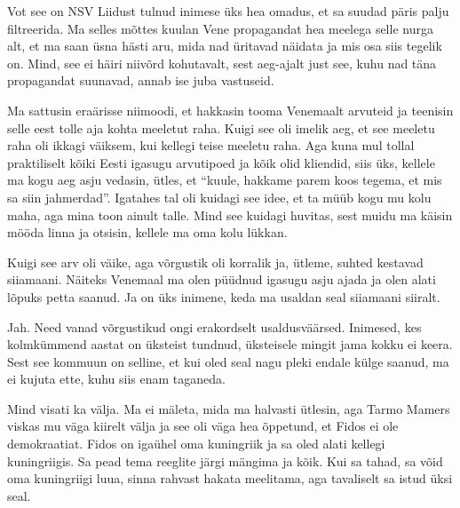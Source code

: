 
Vot see on NSV Liidust tulnud inimese üks hea omadus, et sa suudad päris palju 
filtreerida. Ma selles mõttes kuulan Vene propagandat hea meelega selle nurga 
alt, et ma saan üsna hästi aru, mida nad üritavad näidata ja mis osa siis  
tegelik on. Mind, see ei häiri niivõrd kohutavalt, sest aeg-ajalt just see, 
kuhu nad täna propagandat suunavad,  annab ise juba vastuseid. 


Ma sattusin eraärisse niimoodi, et  hakkasin tooma Venemaalt arvuteid ja 
teenisin selle eest tolle aja kohta meeletut raha. Kuigi see oli imelik aeg, et 
see meeletu raha oli ikkagi väiksem, kui kellegi teise meeletu raha. Aga kuna 
mul  tollal praktiliselt kõiki Eesti igasugu arvutipoed ja kõik olid kliendid, 
siis  üks, kellele ma kogu aeg asju vedasin, ütles, et \enquote{kuule,  hakkame 
parem koos tegema, et mis sa siin jahmerdad}. Igatahes tal oli kuidagi see 
idee, et ta müüb kogu mu kolu maha, aga mina toon ainult talle. Mind see 
kuidagi huvitas, sest muidu ma käisin mööda linna ja otsisin, kellele ma oma 
kolu lükkan. 


Kuigi see arv oli väike, aga võrgustik oli korralik ja, ütleme, suhted kestavad 
siiamaani. Näiteks Venemaal ma olen püüdnud igasugu asju ajada ja olen alati 
lõpuks petta saanud. Ja  on üks inimene, keda ma usaldan seal siiamaani 
siiralt. 


Jah. Need vanad võrgustikud ongi erakordselt usaldusväärsed. Inimesed, kes 
kolmkümmend aastat on üksteist tundnud, üksteisele mingit jama kokku ei keera. 
Sest see kommuun on selline, et kui oled seal nagu pleki endale külge saanud, 
ma ei kujuta ette, kuhu siis enam  taganeda. 


Mind  visati ka välja. Ma ei mäleta, mida ma halvasti ütlesin, aga Tarmo 
Mamers viskas mu väga kiirelt välja ja see oli väga 
hea õppetund, et Fidos ei ole demokraatiat. Fidos on igaühel oma kuningriik ja 
sa oled alati kellegi kuningriigis. Sa pead tema reeglite järgi mängima ja 
kõik. Kui sa tahad, sa võid oma kuningriigi luua, sinna rahvast hakata 
meelitama, aga tavaliselt sa istud üksi seal. 

